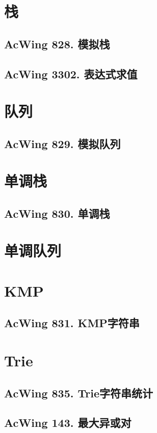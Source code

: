 \section{栈}
\subsection{AcWing 828. 模拟栈}
\subsection{AcWing 3302. 表达式求值}

\section{队列}
\subsection{AcWing 829. 模拟队列}

\section{单调栈}

\subsection{AcWing 830. 单调栈}

\section{单调队列}

\section{KMP}
\subsection{AcWing 831. KMP字符串}

\section{Trie}
\subsection{AcWing 835. Trie字符串统计}
\subsection{AcWing 143. 最大异或对}

